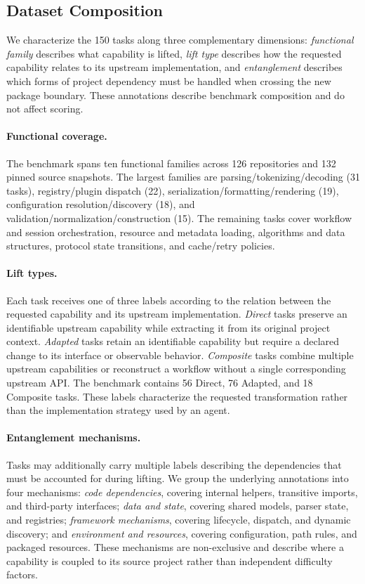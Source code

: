 \documentclass[acmsmall,screen,review,anonymous]{acmart}
\begin{document}
\subsection{Dataset Composition}
\label{sec:suite}

We characterize the 150 tasks along three complementary dimensions:
\emph{functional family} describes what capability is lifted, \emph{lift type}
describes how the requested capability relates to its upstream implementation,
and \emph{entanglement} describes which forms of project dependency must be
handled when crossing the new package boundary. These annotations describe
benchmark composition and do not affect scoring.

\paragraph{Functional coverage.}
The benchmark spans ten functional families across 126 repositories and 132
pinned source snapshots. The largest families are parsing/tokenizing/decoding
(31 tasks), registry/plugin dispatch (22), serialization/formatting/rendering
(19), configuration resolution/discovery (18), and
validation/normalization/construction (15). The remaining tasks cover workflow
and session orchestration, resource and metadata loading, algorithms and data
structures, protocol state transitions, and cache/retry policies.

\paragraph{Lift types.}
Each task receives one of three labels according to the relation between the
requested capability and its upstream implementation. \emph{Direct} tasks
preserve an identifiable upstream capability while extracting it from its
original project context. \emph{Adapted} tasks retain an identifiable capability
but require a declared change to its interface or observable behavior.
\emph{Composite} tasks combine multiple upstream capabilities or reconstruct a
workflow without a single corresponding upstream API. The benchmark contains 56
Direct, 76 Adapted, and 18 Composite tasks. These labels characterize the
requested transformation rather than the implementation strategy used by an
agent.

\paragraph{Entanglement mechanisms.}
Tasks may additionally carry multiple labels describing the dependencies that
must be accounted for during lifting. We group the underlying annotations into
four mechanisms: \emph{code dependencies}, covering internal helpers, transitive
imports, and third-party interfaces; \emph{data and state}, covering shared
models, parser state, and registries; \emph{framework mechanisms}, covering
lifecycle, dispatch, and dynamic discovery; and \emph{environment and
resources}, covering configuration, path rules, and packaged resources. These
mechanisms are non-exclusive and describe where a capability is coupled to its
source project rather than independent difficulty factors.
\end{document}
